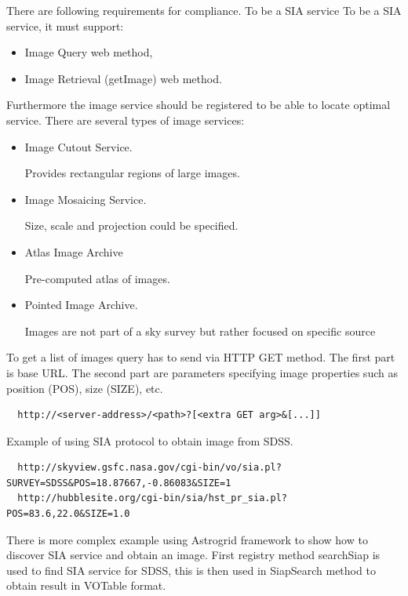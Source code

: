 There are following requirements for compliance. To be a SIA service
To be a SIA service, it must support:

\begin{itemize}
\item Image Query web method,
\item Image Retrieval (getImage) web method.
\end{itemize}

\noindent Furthermore the image service should be registered to be
able to locate optimal service. There are several types of image
services:

\begin{itemize}
\item Image Cutout Service.

  Provides rectangular regions of large images.
\item Image Mosaicing Service.

  Size, scale and projection could be specified.
\item Atlas Image Archive

  Pre-computed atlas of images.
\item Pointed Image Archive.  

  Images are not part of a sky survey but
  rather focused on specific source
\end{itemize}


To get a list of images query has to send via HTTP GET method. The
first part is base URL. The second part are parameters specifying image
properties such as position (POS), size (SIZE), etc.

\begin{lstlisting}
  http://<server-address>/<path>?[<extra GET arg>&[...]]
\end{lstlisting}

Example of using SIA protocol to obtain image from SDSS. 

\begin{lstlisting}
  http://skyview.gsfc.nasa.gov/cgi-bin/vo/sia.pl?SURVEY=SDSS&POS=18.87667,-0.86083&SIZE=1
  http://hubblesite.org/cgi-bin/sia/hst_pr_sia.pl?POS=83.6,22.0&SIZE=1.0
\end{lstlisting}

There is more complex example using Astrogrid framework to show how to
discover SIA service and obtain an image. First registry method
searchSiap is used to find SIA service for SDSS, this is then used in
SiapSearch method to obtain result in VOTable format.  

